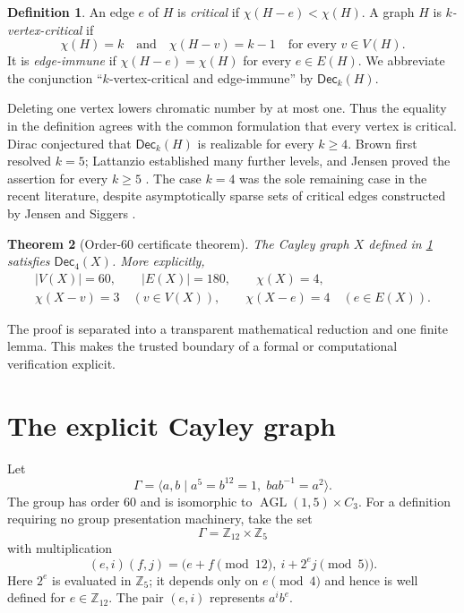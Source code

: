\documentclass[10pt]{amsart}
\newcommand{\Z}{\mathbb Z}
\newcommand{\DiracProperty}{\mathsf{Dec}}
\newtheorem{theorem}{Theorem}[section]
\theoremstyle{definition}
\newtheorem{definition}[theorem]{Definition}
\begin{document}
\begin{definition}
An edge $e$ of $H$ is \emph{critical} if
$\chi(H-e)<\chi(H)$.  A graph $H$ is \emph{$k$-vertex-critical} if
\[
  \chi(H)=k\quad\text{and}\quad \chi(H-v)=k-1
  \quad\text{for every }v\in V(H).
\]
It is \emph{edge-immune} if $\chi(H-e)=\chi(H)$ for every $e\in E(H)$.
We abbreviate the conjunction ``$k$-vertex-critical and edge-immune'' by
$\DiracProperty_k(H)$.
\end{definition}

Deleting one vertex lowers chromatic number by at most one.  Thus the equality
in the definition agrees with the common formulation that every vertex is
critical.  Dirac conjectured that $\DiracProperty_k(H)$ is realizable for every
$k\geq4$.  Brown first resolved $k=5$; Lattanzio established many further
levels, and Jensen proved the assertion for every $k\geq5$
\cite{Brown1992,Lattanzio2002,Jensen2002}.  The case $k=4$ was the sole
remaining case in the recent literature, despite asymptotically sparse sets of
critical edges constructed by Jensen and Siggers
\cite{JensenSiggers2012,SkottovaSteiner2025}.

\begin{theorem}[Order-$60$ certificate theorem]\label{thm:main}
The Cayley graph $X$ defined in \cref{sec:construction} satisfies
$\DiracProperty_4(X)$.  More explicitly,
\[
 \begin{gathered}
 |V(X)|=60,\qquad |E(X)|=180,\qquad \chi(X)=4,\\
 \chi(X-v)=3\quad(v\in V(X)),\qquad
 \chi(X-e)=4\quad(e\in E(X)).
 \end{gathered}
\]
\end{theorem}

The proof is separated into a transparent mathematical reduction and one
finite lemma.  This makes the trusted boundary of a formal or computational
verification explicit.

\section{The explicit Cayley graph}\label{sec:construction}

Let
\[
 \Gamma=\langle a,b\mid a^5=b^{12}=1,\;bab^{-1}=a^2\rangle.
\]
The group has order $60$ and is isomorphic to
$\operatorname{AGL}(1,5)\times C_3$.  For a definition requiring no group
presentation machinery, take the set
\[
  \Gamma=\Z_{12}\times\Z_5
\]
with multiplication
\begin{equation}\label{eq:group-law}
 (e,i)(f,j)=\bigl(e+f\pmod {12},\ i+2^e j\pmod 5\bigr).
\end{equation}
Here $2^e$ is evaluated in $\Z_5$; it depends only on $e\pmod4$ and hence is
well defined for $e\in\Z_{12}$.  The pair $(e,i)$ represents $a^ib^e$.
\end{document}
